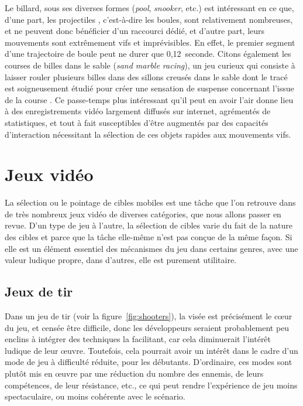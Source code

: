 	\addtocounter{footnote}{1}
	
	Le billard, sous ses diverses formes (\emph{pool}, \emph{snooker}, etc.) est intéressant en ce que, d'une part, les \og projectiles \fg{}, c'est-à-dire les boules, sont relativement nombreuses, et ne peuvent donc bénéficier d'un raccourci dédié, et d'autre part, leurs mouvements sont extrêmement vifs et imprévisibles. En effet, le premier segment d'une trajectoire de boule peut ne durer que 0,12~seconde.\footnotemark{} Citons également les courses de billes dans le sable (\emph{sand marble racing}), un jeu curieux qui consiste à laisser rouler plusieurs billes dans des sillons creusés dans le sable dont le tracé est soigneusement étudié pour créer une sensation de suspense concernant l'issue de la \og course \fg{}. Ce passe-temps plus intéressant qu'il peut en avoir l'air donne lieu à des enregistrements vidéo largement diffusés sur internet,\footnotemark{} agrémentés de statistiques, et tout à fait susceptibles d'être augmentés par des capacités d'interaction nécessitant la sélection de ces objets rapides aux mouvements vifs.
	
	\addtocounter{footnote}{-1}
	
	\addtocounter{footnote}{1}


	\section{Jeux vidéo}
	La sélection ou le pointage de cibles mobiles est une tâche que l'on retrouve dans de très nombreux jeux vidéo de diverses catégories, que nous allons passer en revue. D'un type de jeu à l'autre, la sélection de cibles varie du fait de la nature des cibles et parce que la tâche elle-même n'est pas conçue de la même façon. Si elle est un élément essentiel des mécanismes du jeu dans certains genres, avec une valeur ludique propre, dans d'autres, elle est purement utilitaire.
	
	\subsection{Jeux de tir}
	Dans un jeu de tir (voir la figure~\ref{fig:shooters}), la visée est précisément le cœur du jeu, et censée être difficile, donc les développeurs seraient probablement peu enclins à intégrer des techniques la facilitant, car cela diminuerait l'intérêt ludique de leur œuvre. Toutefois, cela pourrait avoir un intérêt dans le cadre d'un mode de jeu à difficulté réduite, pour les débutants. D'ordinaire, ces modes sont plutôt mis en œuvre par une réduction du nombre des ennemis, de leurs compétences, de leur résistance, etc., ce qui peut rendre l'expérience de jeu moins spectaculaire, ou moins cohérente avec le scénario.
	
